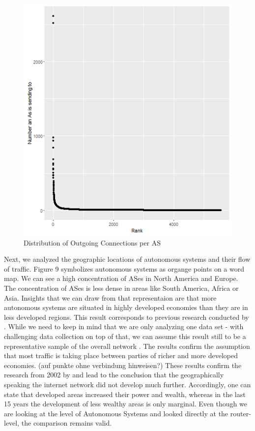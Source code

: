 \documentclass[conference, 11pt]{IEEEtran}
\begin{document}
\vspace{0.5cm}
\begin{figure}[htbp]
\centerline{\includegraphics[scale=0.4]{Graphics/AsFromDistribution.png}}
\caption{Distribution of Outgoing Connections per AS}
\label{fig}
\end{figure}
\vspace{0.5cm}


Next, we analyzed the geographic locations of autonomous systems and their flow of traffic. Figure 9 symbolizes autonomous systems as organge points on a word map. We can see a high concentration of ASes in North America and Europe. The concentration of ASes is less dense in areas like South America, Africa or Asia. Insights that we can draw from that representaion are that more autonomous systems are situated in highly developed economies  than they are in less developed regions. This result corresponds to previous research conducted by \cite{ResearchGeo}. While we need to keep in mind that we are only analyzing one data set - with challenging data collection on top of that, we can assume this result still to be a representative sample of the overall network \cite{CaidaDataCollection}. The results confirm the assumption that most traffic is taking place between parties of richer and more developed economies.  (auf punkte ohne verbindung hinweisen?)
These results confirm the research from 2002 by \cite{geoResearch} and lead to the conclusion that the geographically speaking the internet network did not develop much further. Accordingly, one can state that developed areas increased their power and wealth, whereas in the last 15 years the development of less wealthy areas is only marginal. Even though we are looking at the level of Autonomous Systems and \cite{geoResearch} looked directly at the router-level, the comparison remains valid. \\
\end{document}
